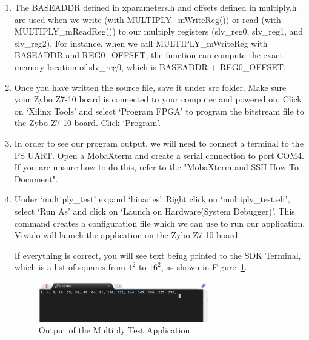 \documentclass[11pt,twoside,titlepage]{article}
\begin{document}
\begin{enumerate}
	\item The BASEADDR defined in xparameters.h and offsets defined in multiply.h are used when we write (with MULTIPLY\_mWriteReg()) or read (with MULTIPLY\_mReadReg()) to our multiply registers (slv\_reg0, slv\_reg1, and slv\_reg2). For instance, when we call MULTIPLY\_mWriteReg with BASEADDR and REG0\_OFFSET, the function can compute the exact memory location of slv\_reg0, which is BASEADDR $+$ REG0\_OFFSET.
	
	\item Once you have written the source file,  save it under src folder. Make sure your Zybo Z7-10 board is connected to your computer and powered on. Click on `Xilinx Tools' and select `Program FPGA' to program the bitstream file to the Zybo Z7-10 board. Click `Program'. 
	
	\item In order to see our program output, we will need to connect a terminal to the PS UART. Open a MobaXterm and create a serial connection to port COM4. If you are unsure how to do this, refer to the "MobaXterm and SSH How-To Document".
	
	\item Under `multiply\_test' expand `binaries'. Right click on `multiply\_test.elf', select `Run As' and click on `Launch on Hardware(System Debugger)'. This command creates a configuration file which we can use to run our application. Vivado will launch the application on the Zybo Z7-10 board.
	
	
	If everything is correct, you will see text being printed to the SDK Terminal, which is a list of squares from $1^2$ to $16^2$, as shown in Figure~\ref{mult_output}. \\
	
		\begin{figure}[!h]
		\begin{center}
			\includegraphics[width=0.7\textwidth]{mult_output}
			\caption{Output of the Multiply Test Application}
			\label{mult_output}
		\end{center}
		
	\end{figure}

\end{enumerate}	
\end{document}
